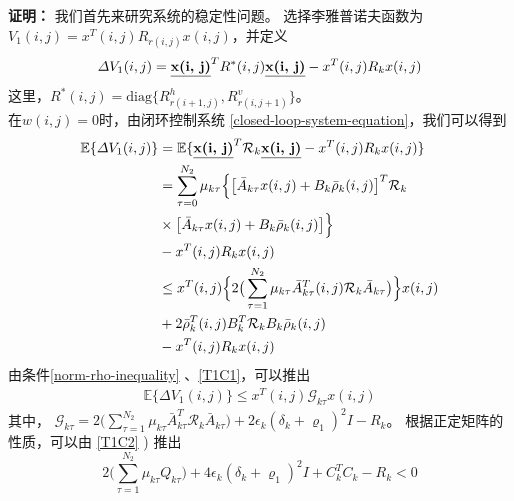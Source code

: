 	{\bf 证明：} 
	我们首先来研究系统的稳定性问题。 选择李雅普诺夫函数为 $V_{1}(i,j) = x^{T}(i,j)R_{r(i,j)}x(i,j)$，并定义
	\begin{equation}\label{VAR-DELTA-V1}
	\begin{split}
	\varDelta V_{1}(i,j) = \emph{\textbf{x(i, j)}}^{T} R^{*}(i,j) \emph{\textbf{x(i, j)}} - x^{T}(i,j)R_{k}x(i,j)
	\end{split}
	\end{equation}
	这里，$R^{*}(i,j)=\mathrm{diag}\{R^{h}_{r(i+1,j)},R^{v}_{r(i,j+1)}\}$。\\
	在$w(i,j)=0$时，由闭环控制系统 \eqref{closed-loop-system-equation}，我们可以得到 
	\begin{equation}
	\begin{split}
	\mathbb{E}\{\varDelta V_{1}(i,j) \}&=\mathbb{E}\{\emph{\textbf{x(i, j)}}^{T}\mathcal{R}_{k}\emph{\textbf{x(i, j)}} - x^{T}(i,j)R_{k}x(i,j) \} \\
	&=  \sum_{\tau =0}^{N_{2}}\mu_{k\tau }\Big\{\big[\bar{A}_{k\tau }x(i,j)+B_{k}\bar{\rho}_{k}(i,j)\big]^{T}\mathcal{R}_{k}\\
	&\times\big[\bar{A}_{k\tau }x(i,j)+B_{k}\bar{\rho}_{k}(i,j)\big]\Big\}\\
	&- x^{T}(i,j)R_{k}x(i,j) \\
	&\leq x^{T}(i,j) \Big\{2\big(\sum_{\tau =1}^{N_{2}}\mu_{k\tau }\bar{A}^{T}_{k\tau }(i,j)\mathcal{R}_{k}\bar{A}_{k\tau }\big)\Big\}x(i,j)\\ &+2\bar{\rho}^{T}_{k}(i,j)B^{T}_{k}\mathcal{R}_{k}B_{k}\bar{\rho}_{k}(i,j) \\
	&-  x^{T}(i,j)R_{k}x(i,j)
	\end{split}
	\end{equation}
	由条件\eqref{norm-rho-inequality} 、\eqref{T1C1}，可以推出
	\begin{equation}\label{combine-one-1}
	\begin{split}
	\mathbb{E}\{\varDelta  V_{1}(i,j) \} \leq x^{T}(i,j)\mathcal{G}_{k\tau }x(i,j)
	\end{split}
	\end{equation}
	其中， $\mathcal{G}_{k\tau }= 2\big(\sum_{\tau =1}^{N_{2}}\mu_{k\tau }\bar{A}^{T}_{k\tau }\mathcal{R}_{k}\bar{A}_{k\tau }\big)
	+ 2\epsilon_{k}(\delta_{k}+\varrho_{1})^{2}I- R_{k}$。
	根据正定矩阵的性质，可以由 \eqref{T1C2} ) 推出
	\begin{equation}
	2\big(\sum_{\tau =1}^{N_{2}}\mu_{k\tau }Q_{k\tau }\big)+4\epsilon_{k}(\delta_{k}+\varrho_{1})^{2}I+C^{T}_{k}C_{k}-R_{k} < 0
	\end{equation}

